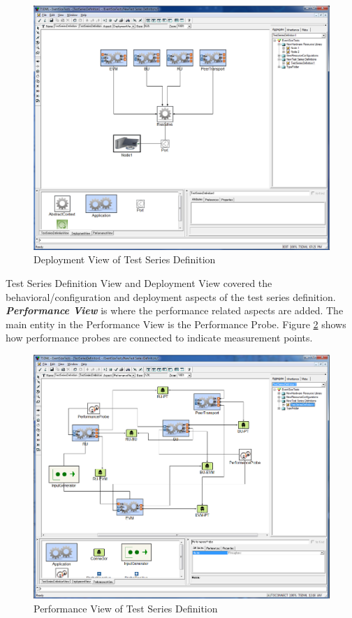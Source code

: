 \begin{figure}
	\centering
		\includegraphics[width=1.00\textwidth]{figures/TSDDeploy.png}
	\caption{Deployment View of Test Series Definition}
	\label{fig:TSDDeploy}
\end{figure}

Test Series Definition View and Deployment View covered the behavioral/configuration and deployment aspects of the test series definition. \textit{\textbf{Performance View}} is where the performance related aspects are added. The main entity in the Performance View is the Performance Probe. Figure \ref{fig:TSDProbe} shows how performance probes are connected to indicate measurement points.

\begin{figure}
	\centering
		\includegraphics[width=1.00\textwidth]{figures/TSDProbe.png}
	\caption{Performance View of Test Series Definition}
	\label{fig:TSDProbe}
\end{figure}

